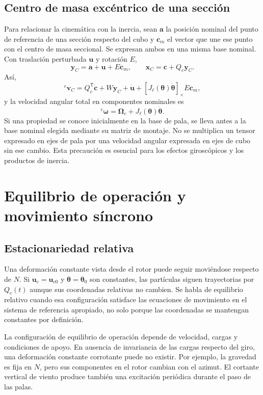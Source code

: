 \documentclass[11pt,a4paper,oneside]{report}
\newcommand{\vct}[1]{\bm{#1}}
\newcommand{\tr}{\mathsf T}
\begin{document}
\subsection{Centro de masa excéntrico de una sección}
Para relacionar la cinemática con la inercia, sean $\vct a$ la posición nominal del punto de referencia de una sección respecto del cubo y $\vct c_m$ el vector que une ese punto con el centro de masa seccional. Se expresan ambos en una misma base nominal. Con traslación perturbada $\vct u$ y rotación $E$,
\begin{equation}
 \vct y_C=\vct a+\vct u+E\vct c_m,
 \qquad \vct x_C=\vct c+Q_c\vct y_C.
\end{equation}
Así,
\begin{equation}
 {}^c\vct v_C=Q_c^\tr\dot{\vct c}+W\vct y_C+\dot{\vct u}
 +\left[J_\ell(\vct\theta)\dot{\vct\theta}\right]_\times E\vct c_m,
 \label{eq:vgfull}
\end{equation}
y la velocidad angular total en componentes nominales es
\begin{equation}
 {}^c\vct\omega=\vct\Omega_c+J_\ell(\vct\theta)\dot{\vct\theta}.
\end{equation}
Si una propiedad se conoce inicialmente en la base de pala, se lleva antes a la base nominal elegida mediante su matriz de montaje. No se multiplica un tensor expresado en ejes de pala por una velocidad angular expresada en ejes de cubo sin ese cambio. Esta precaución es esencial para los efectos giroscópicos y los productos de inercia.

\section{Equilibrio de operación y movimiento síncrono}
\subsection{Estacionariedad relativa}
Una deformación constante vista desde el rotor puede seguir moviéndose respecto de $N$. Si $\vct u_c=\vct u_{c0}$ y $\vct\theta=\vct\theta_0$ son constantes, las partículas siguen trayectorias por $Q_c(t)$ aunque sus coordenadas relativas no cambien. Se habla de equilibrio relativo cuando esa configuración satisface las ecuaciones de movimiento en el sistema de referencia apropiado, no solo porque las coordenadas se mantengan constantes por definición.

La configuración de equilibrio de operación depende de velocidad, cargas y condiciones de apoyo. En ausencia de invariancia de las cargas respecto del giro, una deformación constante corrotante puede no existir. Por ejemplo, la gravedad es fija en $N$, pero sus componentes en el rotor cambian con el azimut. El cortante vertical de viento produce también una excitación periódica durante el paso de las palas.
\end{document}
